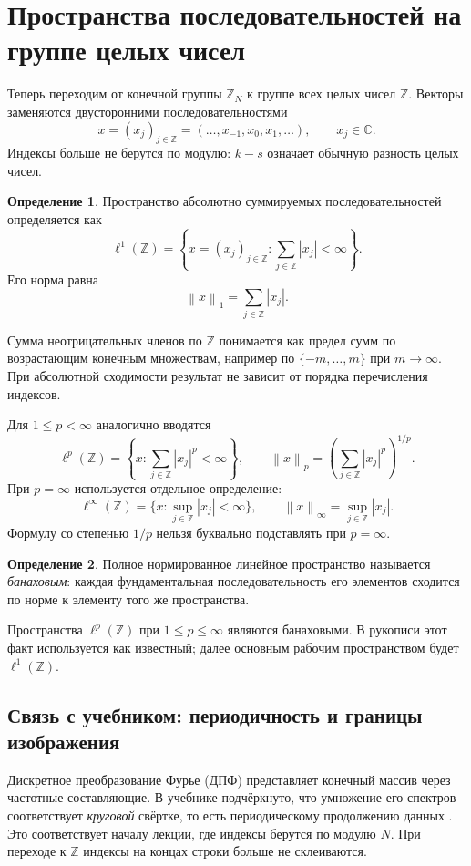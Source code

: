 \documentclass[12pt,a4paper]{article}
\theoremstyle{definition}
\newtheorem{definition}{Определение}
\theoremstyle{remark}
\newcommand{\CC}{\mathbb{C}}
\newcommand{\ZZ}{\mathbb{Z}}
\newcommand{\norm}[1]{\left\lVert #1\right\rVert}
\begin{document}
\section{Пространства последовательностей на группе целых чисел}

Теперь переходим от конечной группы $\ZZ_N$ к группе всех целых чисел
$\ZZ$. Векторы заменяются двусторонними последовательностями
\[
  x=(x_j)_{j\in\ZZ}=(\dots,x_{-1},x_0,x_1,\dots),\qquad x_j\in\CC.
\]
Индексы больше не берутся по модулю: $k-s$ означает обычную разность
целых чисел.

\begin{definition}
Пространство абсолютно суммируемых последовательностей определяется как
\[
  \ell^1(\ZZ)=\left\{x=(x_j)_{j\in\ZZ}:
    \sum_{j\in\ZZ}|x_j|<\infty\right\}.
\]
Его норма равна
\[
  \norm{x}_1=\sum_{j\in\ZZ}|x_j|.
\]
\end{definition}

Сумма неотрицательных членов по $\ZZ$ понимается как предел сумм по
возрастающим конечным множествам, например по $\{-m,\dots,m\}$ при
$m\to\infty$. При абсолютной сходимости результат не зависит от
порядка перечисления индексов.

Для $1\leqslant p<\infty$ аналогично вводятся
\[
  \ell^p(\ZZ)=\left\{x:\sum_{j\in\ZZ}|x_j|^p<\infty\right\},
  \qquad \norm{x}_p=\left(\sum_{j\in\ZZ}|x_j|^p\right)^{1/p}.
\]
При $p=\infty$ используется отдельное определение:
\[
  \ell^\infty(\ZZ)=\{x:\sup_{j\in\ZZ}|x_j|<\infty\},\qquad
  \norm{x}_\infty=\sup_{j\in\ZZ}|x_j|.
\]
Формулу со степенью $1/p$ нельзя буквально подставлять при $p=\infty$.

\begin{definition}
Полное нормированное линейное пространство называется \emph{банаховым}:
каждая фундаментальная последовательность его элементов сходится
по норме к элементу того же пространства.
\end{definition}

Пространства $\ell^p(\ZZ)$ при $1\leqslant p\leqslant\infty$ являются
банаховыми. В рукописи этот факт используется как известный; далее
основным рабочим пространством будет $\ell^1(\ZZ)$.

\subsection{Связь с учебником: периодичность и границы изображения}

Дискретное преобразование Фурье (ДПФ) представляет конечный массив
через частотные составляющие. В учебнике подчёркнуто, что умножение
его спектров соответствует \emph{круговой} свёртке, то есть
периодическому продолжению данных
\cite[\S\,4.4.1, с.~270; \S\,4.6.6, с.~298]{GW2012}.
Это соответствует началу лекции, где индексы берутся по модулю $N$.
При переходе к $\ZZ$ индексы на концах строки больше не склеиваются.
\end{document}
